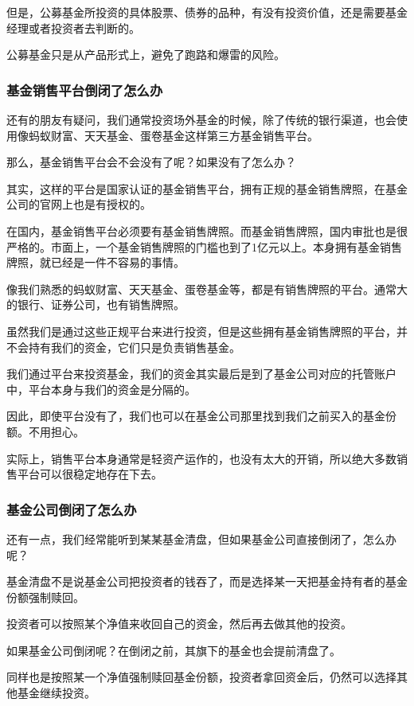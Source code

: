 但是，公募基金所投资的具体股票、债券的品种，有没有投资价值，还是需要基金经理或者投资者去判断的。

公募基金只是从产品形式上，避免了跑路和爆雷的风险。

\subsubsection{基金销售平台倒闭了怎么办}

还有的朋友有疑问，我们通常投资场外基金的时候，除了传统的银行渠道，也会使用像蚂蚁财富、天天基金、蛋卷基金这样第三方基金销售平台。

那么，基金销售平台会不会没有了呢？如果没有了怎么办？

其实，这样的平台是国家认证的基金销售平台，拥有正规的基金销售牌照，在基金公司的官网上也是有授权的。

在国内，基金销售平台必须要有基金销售牌照。而基金销售牌照，国内审批也是很严格的。市面上，一个基金销售牌照的门槛也到了1亿元以上。本身拥有基金销售牌照，就已经是一件不容易的事情。

像我们熟悉的蚂蚁财富、天天基金、蛋卷基金等，都是有销售牌照的平台。通常大的银行、证券公司，也有销售牌照。

虽然我们是通过这些正规平台来进行投资，但是这些拥有基金销售牌照的平台，并不会持有我们的资金，它们只是负责销售基金。

我们通过平台来投资基金，我们的资金其实最后是到了基金公司对应的托管账户中，平台本身与我们的资金是分隔的。

因此，即使平台没有了，我们也可以在基金公司那里找到我们之前买入的基金份额。不用担心。

实际上，销售平台本身通常是轻资产运作的，也没有太大的开销，所以绝大多数销售平台可以很稳定地存在下去。

\subsubsection{基金公司倒闭了怎么办}

还有一点，我们经常能听到某某基金清盘，但如果基金公司直接倒闭了，怎么办呢？

基金清盘不是说基金公司把投资者的钱吞了，而是选择某一天把基金持有者的基金份额强制赎回。

投资者可以按照某个净值来收回自己的资金，然后再去做其他的投资。

如果基金公司倒闭呢？在倒闭之前，其旗下的基金也会提前清盘了。

同样也是按照某一个净值强制赎回基金份额，投资者拿回资金后，仍然可以选择其他基金继续投资。

